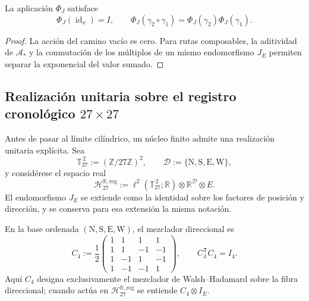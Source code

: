 \begin{proposition}
\label{x_reciprocidad:prop:fase-interna-functor-rev2}
La aplicación \(\Phi_J\) satisface
\[
 \Phi_J(\operatorname{id}_x)=I,
 \qquad
 \Phi_J(\gamma_2\circ\gamma_1)
 =\Phi_J(\gamma_2)\Phi_J(\gamma_1).
\]
\end{proposition}

\begin{proof}
La acción del camino vacío es cero. Para rutas composables, la aditividad de
\(\mathcal A_*\) y la conmutación de los múltiplos de un mismo endomorfismo
\(J_E\) permiten separar la exponencial del valor sumado.
\end{proof}

\subsection{Realización unitaria sobre el registro cronológico
\texorpdfstring{\(27\times27\)}{27 x 27}}
\label{x_reciprocidad:sec:realizacion-unitaria-registro-27-rev3}

Antes de pasar al límite cilíndrico, un núcleo finito admite una realización
unitaria explícita. Sea
\[
 \mathbb T_{27}^{\,2}:=(\mathbb Z/27\mathbb Z)^2,
 \qquad
 \mathcal D:=\{\mathrm N,\mathrm S,\mathrm E,\mathrm W\},
\]
y considérese el espacio real
\[
 \mathcal H_{27}^{\mathbb R,\mathrm{reg}}
 :=\ell^2(\mathbb T_{27}^{\,2};\mathbb R)
   \otimes\mathbb R^{\mathcal D}\otimes E.
\]
El endomorfismo \(J_E\) se extiende como la identidad sobre los factores de
posición y dirección, y se conserva para esa extensión la misma notación.

En la base ordenada
\((\mathrm N,\mathrm S,\mathrm E,\mathrm W)\), el mezclador direccional es
\begin{equation}
 C_4:=\frac12
 \begin{pmatrix}
  1&1&1&1\\
  1&1&-1&-1\\
  1&-1&1&-1\\
  1&-1&-1&1
 \end{pmatrix},
 \qquad C_4^{\mathsf T}C_4=I_4.
 \label{x_reciprocidad:eq:mezclador-walsh-registro-27-rev3}
\end{equation}
Aquí \(C_4\) designa exclusivamente el mezclador de Walsh--Hadamard sobre la
fibra direccional; cuando actúa en
\(\mathcal H_{27}^{\mathbb R,\mathrm{reg}}\) se entiende
\(C_4\otimes I_E\).

